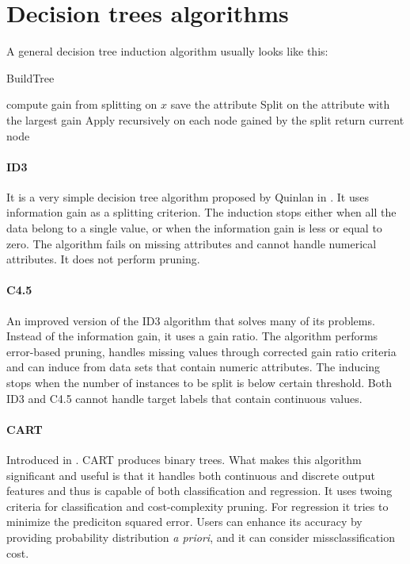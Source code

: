 \documentclass[thesis=B,english]{FITthesis}[2012/10/20]
\begin{document}
		\section{Decision trees algorithms}

			A general decision tree induction algorithm usually looks like this:

			\begin{algorithm}[H]
			\caption{BuildTree}
			\SetAlgoLined
			\Begin
			{
			 {
				compute gain from splitting on $x$
				 {
					save the attribute
				}
			}
			Split on the attribute with the largest gain
			Apply recursively on each node gained by the split
			return current node
			}
			\end{algorithm}

			\paragraph*{ID3} It is a very simple decision tree algorithm proposed by Quinlan in \cite{INDUCTIONOFDT}. It uses information gain as a splitting criterion. The induction stops either when all the data belong to a single value, or when the information gain is less or equal to zero. The algorithm fails on missing attributes and cannot handle numerical attributes. It does not perform pruning.

			\paragraph*{C4.5} An improved version of the ID3 algorithm \cite{C45-NUMERICAL} that solves many of its problems. Instead of the information gain, it uses a gain ratio. The algorithm performs error-based pruning, handles missing values through corrected gain ratio criteria and can induce from data sets that contain numeric attributes. The inducing stops when the number of instances to be split is below certain threshold. Both ID3 and C4.5 cannot handle target labels that contain continuous values.

			\paragraph*{CART} Introduced in \cite{CART}. CART produces binary trees. What makes this algorithm significant and useful is that it handles both continuous and discrete output features and thus is capable of both classification and regression. It uses twoing criteria for classification and cost-complexity pruning. For regression it tries to minimize the prediciton squared error. Users can enhance its accuracy by providing probability distribution \textit{a priori}, and it can consider missclassification cost.
\end{document}
